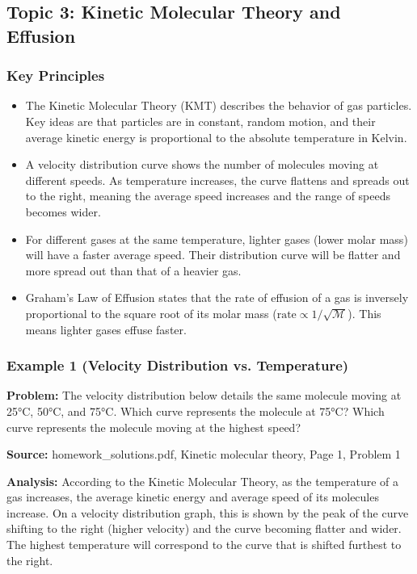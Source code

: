 \documentclass{article}
\begin{document}
\subsection{Topic 3: Kinetic Molecular Theory and Effusion}
\subsubsection{Key Principles}
\begin{itemize}
    \item The Kinetic Molecular Theory (KMT) describes the behavior of gas particles. Key ideas are that particles are in constant, random motion, and their average kinetic energy is proportional to the absolute temperature in Kelvin.
    \item A velocity distribution curve shows the number of molecules moving at different speeds. As temperature increases, the curve flattens and spreads out to the right, meaning the average speed increases and the range of speeds becomes wider.
    \item For different gases at the same temperature, lighter gases (lower molar mass) will have a faster average speed. Their distribution curve will be flatter and more spread out than that of a heavier gas.
    \item Graham's Law of Effusion states that the rate of effusion of a gas is inversely proportional to the square root of its molar mass ($\text{rate} \propto 1/\sqrt{\mathcal{M}}$). This means lighter gases effuse faster.
\end{itemize}

\subsubsection{Example 1 (Velocity Distribution vs. Temperature)}
\textbf{Problem:} The velocity distribution below details the same molecule moving at 25°C, 50°C, and 75°C. Which curve represents the molecule at 75°C? Which curve represents the molecule moving at the highest speed?

\textbf{Source:} homework\_solutions.pdf, Kinetic molecular theory, Page 1, Problem 1

\textbf{Analysis:} According to the Kinetic Molecular Theory, as the temperature of a gas increases, the average kinetic energy and average speed of its molecules increase. On a velocity distribution graph, this is shown by the peak of the curve shifting to the right (higher velocity) and the curve becoming flatter and wider. The highest temperature will correspond to the curve that is shifted furthest to the right.
\end{document}
